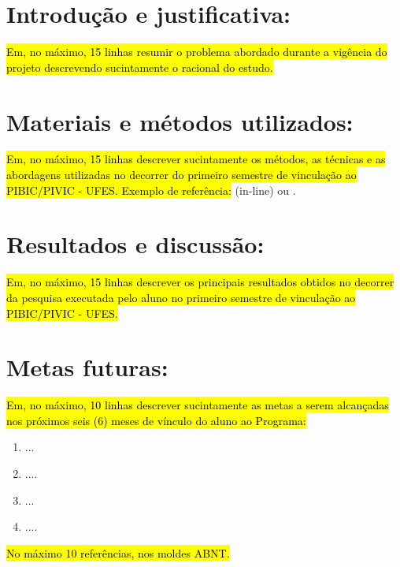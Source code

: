 \documentclass[10pt, a4paper]{article}
\begin{document}
\clearpage




\section*{Introdução e justificativa:}

\hl{Em, no máximo, 15 linhas resumir o problema abordado durante a vigência do projeto descrevendo sucintamente o racional do estudo.}




\section*{Materiais e métodos utilizados:}

\hl{Em, no máximo, 15 linhas descrever sucintamente os métodos, as técnicas e as abordagens utilizadas no decorrer do primeiro semestre de vinculação ao PIBIC/PIVIC - UFES. Exemplo de referência:} \cite{guarino-et-al:hobook09} (in-line) ou \citep{guarino-et-al:hobook09}.




\section*{Resultados e discussão:}

\hl{Em, no máximo, 15 linhas descrever os principais resultados obtidos no decorrer da pesquisa executada pelo aluno no primeiro semestre de vinculação ao PIBIC/PIVIC - UFES.}




\section*{Metas futuras:}

\hl{Em, no máximo, 10 linhas descrever sucintamente as metas a serem alcançadas nos próximos seis (6)  meses de vínculo do aluno ao Programa:}
\begin{enumerate}
	\item ...
	
	\item ....
	
	\item ...
	
	\item ....
\end{enumerate}





\hl{No máximo 10 referências, nos moldes ABNT.}


\end{document}
